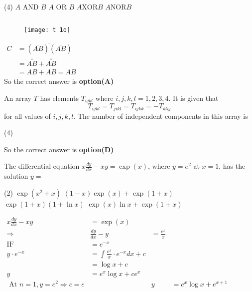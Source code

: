 \begin{questions}
\begin{tasks}(4)
	\task[\textbf{A.}]   $A$ AND $B$
	\task[\textbf{B.}] $A$ OR $B$
	\task[\textbf{C.}] $A \mathrm{XOR} B$
	\task[\textbf{D.}] $A \mathrm{NOR} B$
\end{tasks}
\begin{answer}$\left. \right. $
	\begin{figure}[H]
		\centering
		\texttt{[image: t 1o]}
		\end{figure}
	$\begin{aligned} C &=\overline{(\overline{A B})(\overline{A B})} \\ &=\overline{\overline{A B}}+\overline{\overline{A B}} \\ &=A B+A B=A B \end{aligned}$\\
		So the correct answer is \textbf{option(A)}
\end{answer}
\begin{minipage}{\textwidth}
	\question An array $T$ has elements $T_{i j k l}$ where $i, j, k, l=1,2,3,4$. It is given that
	$$
	T_{i j k l}=T_{j i k l}=T_{i j k k}=-T_{k l i j}
	$$
	for all values of $i, j, k, l$. The number of independent components in this array is
\end{minipage}
\begin{tasks}(4)
\end{tasks}
\begin{answer}
	So the correct answer is \textbf{option(D)}
\end{answer}
\begin{minipage}{\textwidth}
	\question The differential equation $x \frac{d y}{d x}-x y=\exp (x)$, where $y=e^{2}$ at $x=1$, has the solution $y=$
\end{minipage}
\begin{tasks}(2)
	\task[\textbf{A.}] $\exp \left(x^{2}+x\right)$
	\task[\textbf{B.}] $(1-x) \exp (x)+\exp (1+x)$
	\task[\textbf{C.}] $\exp (1+x)(1+\ln x)$
	\task[\textbf{D.}]   $\exp (x) \ln x+\exp (1+x)$
\end{tasks}
\begin{answer}$\left. \right. $\\
	$\begin{aligned} x \frac{d y}{d x}-x y &=\exp (x) \\ \Rightarrow & \frac{d y}{d x}-y &=\frac{e^{x}}{x} \\ \mathrm{IF} &=e^{-x} \\ y \cdot e^{-x} &=\int \frac{e^{x}}{x} \cdot e^{-x} d x+c \\ &=\log x+c \\ y &=e^{x} \log x+c e^{x} \\ \text { At } n=1, y=e^{2} \Rightarrow c=e & & y &=e^{x} \log x+e^{x+1} \end{aligned}$\\

\end{answer}
\end{questions}
